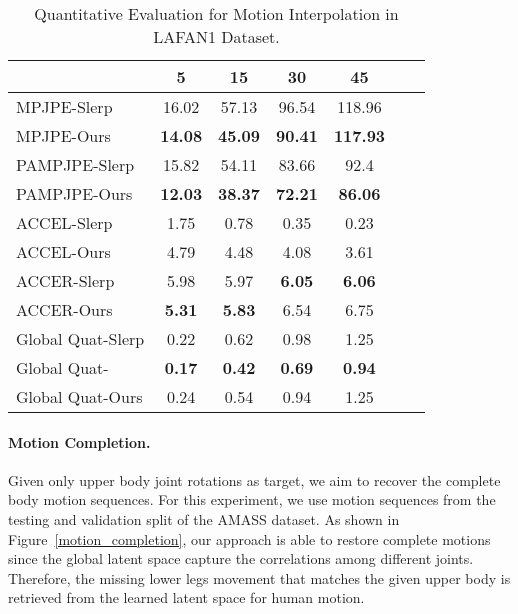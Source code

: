 \begin{table}[t!]
\small
\begin{center}
\footnotesize{
\setlength{\tabcolsep}{10pt}
\begin{tabular}{@{}l||cccccc@{}} 
\hline
 & 5  & 15 & 30 & 45 \\ \hline\hline
MPJPE-Slerp & 16.02 & 57.13 & 96.54 & 118.96 \\ \hline
MPJPE-Ours & \textbf{14.08} & \textbf{45.09} & \textbf{90.41} & \textbf{117.93} \\ \hline \hline
PAMPJPE-Slerp & 15.82 & 54.11 & 83.66 & 92.4 \\ \hline
PAMPJPE-Ours & \textbf{12.03} & \textbf{38.37} & \textbf{72.21} & \textbf{86.06} \\ \hline \hline
ACCEL-Slerp & 1.75 & 0.78 & 0.35 & 0.23 \\ \hline
ACCEL-Ours & 4.79 & 4.48 & 4.08 & 3.61 \\ \hline \hline
ACCER-Slerp & 5.98 & 5.97 & \textbf{6.05} & \textbf{6.06} \\ \hline
ACCER-Ours & \textbf{5.31} & \textbf{5.83} & 6.54 & 6.75 \\ \hline \hline
Global Quat-Slerp & 0.22 & 0.62 & 0.98 & 1.25 \\ \hline
Global Quat-\cite{harvey2020robust} & \textbf{0.17}  & \textbf{0.42} & \textbf{0.69} & \textbf{0.94} \\ \hline
Global Quat-Ours & 0.24 & 0.54 & 0.94 & 1.25 \\ \hline
\end{tabular}
}
\end{center}
\vspace{-5mm}
\caption{\small Quantitative Evaluation for Motion Interpolation in LAFAN1 Dataset.}
\label{table:lafan_interpolation}
\vspace{-6mm}
\end{table}

\vspace{-4mm}
\paragraph{Motion Completion.}
Given only upper body joint rotations as target, we aim to recover the complete body motion sequences.
For this experiment, we use motion sequences from the testing and validation split of the AMASS dataset.
As shown in Figure~\ref{motion_completion}, our approach is able to restore complete motions since the global latent space capture the correlations among different joints.
Therefore, the missing lower legs movement that matches the given upper body is retrieved from the learned latent space for human motion.



